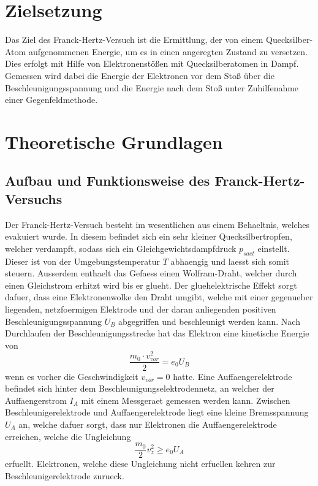 \section{Zielsetzung}
Das Ziel des Franck-Hertz-Versuch ist die Ermittlung, der von einem Quecksilber-Atom aufgenommenen Energie, um es in einen angeregten Zustand zu versetzen. Dies erfolgt mit Hilfe von Elektronenstößen mit Quecksilberatomen in Dampf. Gemessen wird dabei die Energie der Elektronen vor dem Stoß über die Beschleunigungsspannung und die Energie nach dem Stoß unter Zuhilfenahme einer Gegenfeldmethode. 
\section{Theoretische Grundlagen}
\subsection{Aufbau und Funktionsweise des Franck-Hertz-Versuchs}
Der Franck-Hertz-Versuch besteht im wesentlichen aus einem Behaeltnis, welches evakuiert wurde. In diesem befindet sich ein sehr kleiner Quecksilbertropfen, welcher verdampft, sodass sich ein Gleichgewichtsdampfdruck $p_{saet}$ einstellt. Dieser ist von der Umgebungstemperatur $T$ abhaengig und laesst sich somit steuern. Ausserdem enthaelt das Gefaess einen Wolfram-Draht, welcher durch einen Gleichstrom erhitzt wird bis er glueht. Der gluehelektrische Effekt sorgt dafuer, dass eine Elektronenwolke den Draht umgibt, welche mit einer gegenueber liegenden, netzfoermigen Elektrode und der daran anliegenden positiven Beschleunigungsspannung $U_B$ abgegriffen und beschleunigt werden kann. Nach Durchlaufen der Beschleunigungsstrecke hat das Elektron eine kinetische Energie von
\begin{equation}
    \frac{m_0\cdot v^2_{vor}}{2}=e_0U_B \nonumber
\end{equation}
wenn es vorher die Geschwindigkeit $v_{vor}=0$ hatte. Eine Auffaengerelektrode befindet sich hinter dem Beschleunigungselektrodennetz, an welcher der Auffaengerstrom $I_A$ mit einem Messgeraet gemessen werden kann. Zwischen Beschleunigerelektrode und Auffaengerelektrode liegt eine kleine Bremsspannung $U_A$ an, welche dafuer sorgt, dass nur Elektronen die Auffaengerelektrode erreichen, welche die Ungleichung 
\begin{equation}
    \frac{m_0}{2}v^2_z\geq e_0U_A
\end{equation}
erfuellt. Elektronen, welche diese Ungleichung nicht erfuellen kehren zur Beschleunigerelektrode zurueck.
